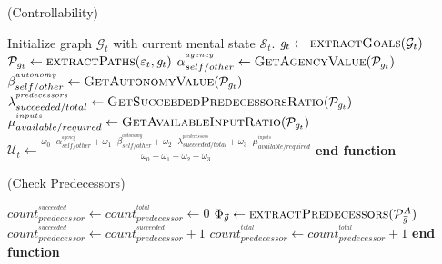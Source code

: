 \documentclass{article}
\begin{document}
\begin{algorithm}
	\caption{(Controllability)}
	\label{array-sum}
	\begin{algorithmic}[1]
			\Statex
			\State Initialize graph $\mathcal{G}_{t}$ with current mental state
			$\mathcal{S}_{t}$.
			\Statex
			\State $\mathit{g}_{t} \gets \Call{extractGoals}{\mathcal{G}_{t}}$ 
			\State $\mathcal{P}_{\mathit{g}_{t}} \gets \Call{extractPaths}{\varepsilon_t,
			\mathit{g}_{t}}$
			\Statex
			\State $\alpha_{self/other}^{^{agency}} \gets
			\Call{GetAgencyValue}{\mathcal{P}_{\mathit{g}_{t}}}$ 
			\Statex
			\State $\beta_{self/other}^{^{autonomy}} \gets
			\Call{GetAutonomyValue}{\mathcal{P}_{\mathit{g}_{t}}}$
			\Statex
			\State $\lambda_{succeeded/total}^{^{predecessors}} \gets
			\Call{GetSucceededPredecessorsRatio}{\mathcal{P}_{\mathit{g}_{t}}}$
			\Statex
			\State $\mu_{available/required}^{^{inputs}} \gets
			\Call{GetAvailableInputRatio}{\mathcal{P}_{\mathit{g}_{t}}}$
			\Statex
			\State $\mathcal{U}_{t} \gets
			\frac{\omega_{0}\cdot \alpha_{self/other}^{^{agency}} +
			\omega_{1}\cdot \beta_{self/other}^{^{autonomy}} + \omega_{2}\cdot
			\lambda_{succeeded/total}^{^{predecessors}} + \omega_{3}\cdot
			\mu_{available/required}^{^{inputs}}}{\omega_{0} + \omega_{1} + \omega_{2} +
			\omega_{3}}$
			\Statex
				\State {}
			\Else
				\State {}
			\EndIf
		\EndFunction
		\State \textbf{end function}
		\end{algorithmic}
	\end{algorithm}
	
\pagebreak
	
\begin{algorithm}
	\caption{(Check Predecessors)}
	\label{array-sum}
	\begin{algorithmic}[1]
			\Statex
			\State $count_{predecessor}^{^{succeeded}} \gets
			count_{predecessor}^{^{total}} \gets 0$
			\Statex
			\State $\Phi_{\vec{\mathit{g}}} \gets
			\Call{extractPredecessors}{\mathcal{P}_{\vec{\mathit{g}}}^{A}}$
			\Statex
					\State $count_{predecessor}^{^{succeeded}} \gets count_{predecessor}^{^{succeeded}} + 1$
				\EndIf
				\State $count_{predecessor}^{^{total}} \gets count_{predecessor}^{^{total}} + 1$
			\EndFor
			\Statex
			\State {}
		\EndFunction 
	\State \textbf{end function}
	\end{algorithmic}
\end{algorithm}
\end{document}
